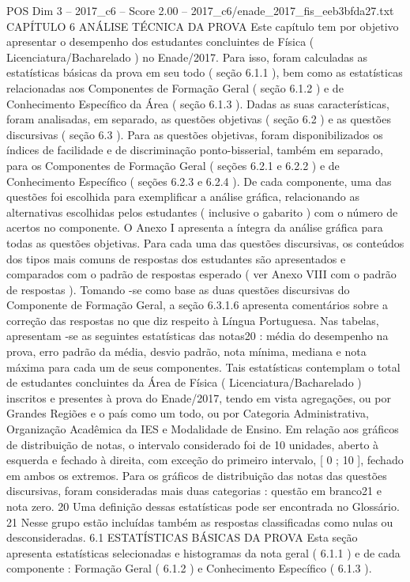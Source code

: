 \begin{textsample}{POS Dim 3 – 2017\_c6 – Score 2.00 – 2017\_c6/enade\_2017\_fis\_eeb3bfda27.txt}  \label{ex:f3_pos_195}
CAPÍTULO 6 ANÁLISE TÉCNICA DA PROVA Este capítulo tem por objetivo apresentar o desempenho dos estudantes concluintes de Física ( Licenciatura/Bacharelado ) no Enade/2017.
Para isso, foram calculadas as estatísticas básicas da prova em seu todo ( seção 6.1.1 ), bem como as estatísticas relacionadas aos Componentes de Formação Geral ( seção 6.1.2 ) e de Conhecimento Específico da Área ( seção 6.1.3 ).
Dadas as suas características, foram analisadas, em separado, as questões objetivas ( seção 6.2 ) e as questões discursivas ( seção 6.3 ).
Para as questões objetivas, foram disponibilizados os índices de facilidade e de discriminação ponto-bisserial, também em separado, para os Componentes de Formação Geral ( seções 6.2.1 e 6.2.2 ) e de Conhecimento Específico ( seções 6.2.3 e 6.2.4 ).
De cada componente, uma das questões foi escolhida para exemplificar a análise gráfica, relacionando as alternativas escolhidas pelos estudantes ( inclusive o gabarito ) com o número de acertos no componente.
O Anexo I apresenta a íntegra da análise gráfica para todas as questões objetivas.
Para cada uma das questões discursivas, os conteúdos dos tipos mais comuns de respostas dos estudantes são apresentados e comparados com o padrão de respostas esperado ( ver Anexo VIII com o padrão de respostas ).
Tomando -se como base as duas questões discursivas do Componente de Formação Geral, a seção 6.3.1.6 apresenta comentários sobre a correção das respostas no que diz respeito à Língua Portuguesa.
Nas tabelas, apresentam -se as seguintes estatísticas das notas20 : média do desempenho na prova, erro padrão da média, desvio padrão, nota mínima, mediana e nota máxima para cada um de seus componentes.
Tais estatísticas contemplam o total de estudantes concluintes da Área de Física ( Licenciatura/Bacharelado ) inscritos e presentes à prova do Enade/2017, tendo em vista agregações, ou por Grandes Regiões e o país como um todo, ou por Categoria Administrativa, Organização Acadêmica da IES e Modalidade de Ensino.
Em relação aos gráficos de distribuição de notas, o intervalo considerado foi de 10 unidades, aberto à esquerda e fechado à direita, com exceção do primeiro intervalo, [ 0 ; 10 ], fechado em ambos os extremos.
Para os gráficos de distribuição das notas das questões discursivas, foram consideradas mais duas categorias : questão em branco21 e nota zero. 20 Uma definição dessas estatísticas pode ser encontrada no Glossário. 21 Nesse grupo estão incluídas também as respostas classificadas como nulas ou desconsideradas. 6.1 ESTATÍSTICAS BÁSICAS DA PROVA Esta seção apresenta estatísticas selecionadas e histogramas da nota geral ( 6.1.1 ) e de cada componente : Formação Geral ( 6.1.2 ) e Conhecimento Específico ( 6.1.3 ).

\end{textsample}

